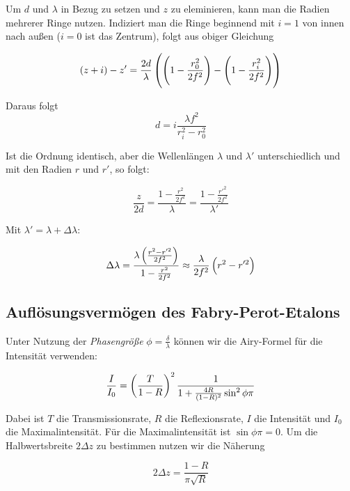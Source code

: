 \documentclass[a4paper,german,12pt,smallheadings]{scrartcl}
\begin{document}
Um $d$ und $\lambda$ in Bezug zu setzen und $z$ zu eleminieren, kann man die
Radien mehrerer Ringe nutzen. Indiziert man die Ringe beginnend mit $i = 1$ von
innen nach außen ($i = 0$ ist das Zentrum), folgt aus obiger Gleichung

\begin{equation}
  (z+i) - z' = \frac{2d}{\lambda} \del{\del{1-\frac{r_0^2}{2f^2}} - \del{1-\frac{r_i^2}{2f^2}}}
\end{equation}

Daraus folgt
\begin{equation}
  d = i \frac{\lambda f^2}{r_i^2 - r_0^2}
  \label{eq:deq}
\end{equation}

Ist die Ordnung identisch, aber die Wellenlängen $\lambda$ und $\lambda'$
unterschiedlich und mit den Radien $r$ und $r'$, so folgt:

\begin{equation}
  \frac{z}{2d} = \frac{1 - \frac{r^2}{2f^2}}{\lambda} = \frac{1 - \frac{r'^2}{2f^2}}{\lambda'}
\end{equation}

Mit $\lambda' = \lambda + \Delta \lambda$:

\begin{equation}
  \Delta \lambda = \frac{\lambda \del{\frac{r^2 - r'^2}{2f^2}}}{1 - \frac{r^2}{2f^2}} \approx \frac{\lambda}{2f^2} \del{r^2 - r'^2}
  \label{eq:linewidth}
\end{equation}

\subsection{Auflösungsvermögen des Fabry-Perot-Etalons}

Unter Nutzung der \textit{Phasengröße} $\phi = \frac{\delta}{\lambda}$ können
wir die Airy-Formel für die Intensität verwenden:

\begin{equation}
  \frac{I}{I_0} = \del{\frac{T}{1-R}}^2 \frac{1}{1+\frac{4R}{(1-R)^2} \sin^2 \phi \pi}
\end{equation}

Dabei ist $T$ die Transmissionsrate, $R$ die Reflexionsrate, $I$ die Intensität
und $I_0$ die Maximalintensität. Für die Maximalintensität ist $\sin \phi \pi =
0$. Um die Halbwertsbreite $2 \Delta z$ zu bestimmen nutzen wir die Näherung

\begin{equation}
  2 \Delta z = \frac{1-R}{\pi \sqrt{R}}
\end{equation}
\end{document}
